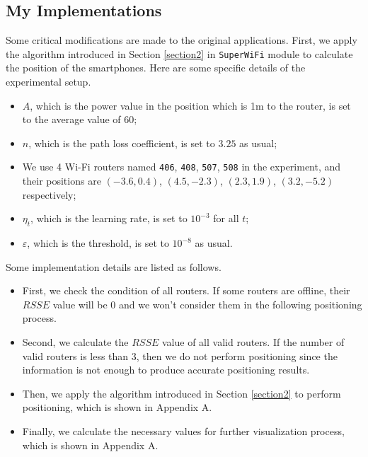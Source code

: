 \documentclass[12pt, a4paper]{article}
\theoremstyle{definition}
\begin{document}
\subsection{My Implementations}\label{section3.2}
Some critical modifications are made to the original applications. First, we apply the algorithm introduced in Section \ref{section2} in \texttt{SuperWiFi} module to calculate the position of the smartphones. Here are some specific details of the experimental setup.
\begin{itemize}
	\item $A$, which is the power value in the position which is 1m to the router, is set to the average value of $60$;
	\item $n$, which is the path loss coefficient, is set to $3.25$ as usual;
	\item We use 4 Wi-Fi routers named \texttt{406}, \texttt{408}, \texttt{507}, \texttt{508} in the experiment, and their positions are $(-3.6, 0.4)$, $(4.5, -2.3)$, $(2.3, 1.9)$, $(3.2, -5.2)$ respectively;
	\item $\eta_t$, which is the learning rate, is set to $10^{-3}$ for all $t$;
	\item $\varepsilon$, which is the threshold, is set to $10^{-8}$ as usual.
\end{itemize}

Some implementation details are listed as follows.
\begin{itemize}
    \item First, we check the condition of all routers. If some routers are offline, their $RSSE$ value will be $0$ and we won't consider them in the following positioning process.
    \item Second, we calculate the $RSSE$ value of all valid routers. If the number of valid routers is less than $3$, then we do not perform positioning since the information is not enough to produce accurate positioning results.
    \item Then, we apply the algorithm introduced in Section \ref{section2} to perform positioning, which is shown in Appendix A.
    \item Finally, we calculate the necessary values for further visualization process, which is shown in Appendix A.
\end{itemize}
\end{document}
